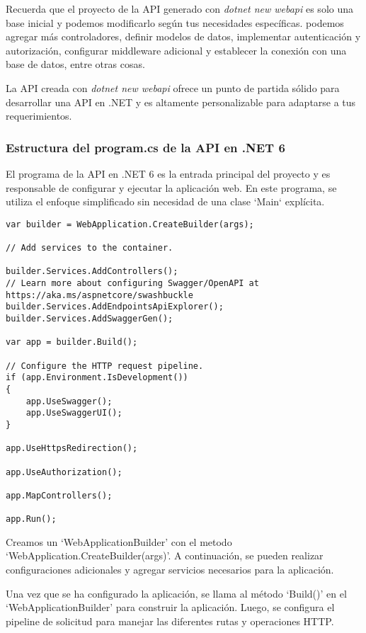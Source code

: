\documentclass[executivepaper]{article}
\begin{document}
Recuerda que el proyecto de la API generado con \emph{dotnet new webapi} es solo una base inicial y podemos modificarlo según tus necesidades específicas. podemos agregar más controladores, definir modelos de datos, implementar autenticación y autorización, configurar middleware adicional y establecer la conexión con una base de datos, entre otras cosas.

La API creada con \emph{dotnet new webapi} ofrece un punto de partida sólido para desarrollar una API en .NET y es altamente personalizable para adaptarse a tus requerimientos.

\subsubsection*{Estructura del program.cs de la API en .NET 6}

El programa de la API en .NET 6 es la entrada principal del proyecto y es responsable de configurar y ejecutar la aplicación web. En este programa, se utiliza el enfoque simplificado sin necesidad de una clase `Main` explícita.

\begin{lstlisting}
var builder = WebApplication.CreateBuilder(args);

// Add services to the container.

builder.Services.AddControllers();
// Learn more about configuring Swagger/OpenAPI at https://aka.ms/aspnetcore/swashbuckle
builder.Services.AddEndpointsApiExplorer();
builder.Services.AddSwaggerGen();

var app = builder.Build();

// Configure the HTTP request pipeline.
if (app.Environment.IsDevelopment())
{
    app.UseSwagger();
    app.UseSwaggerUI();
}

app.UseHttpsRedirection();

app.UseAuthorization();

app.MapControllers();

app.Run();    
\end{lstlisting}

Creamos un \enquote*{WebApplicationBuilder} con el metodo \enquote*{WebApplication.CreateBuilder(args)}. A continuación, se pueden realizar configuraciones adicionales y agregar servicios necesarios para la aplicación.

Una vez que se ha configurado la aplicación, se llama al método \enquote*{Build()} en el \enquote*{WebApplicationBuilder} para construir la aplicación. Luego, se configura el pipeline de solicitud para manejar las diferentes rutas y operaciones HTTP.
\end{document}
